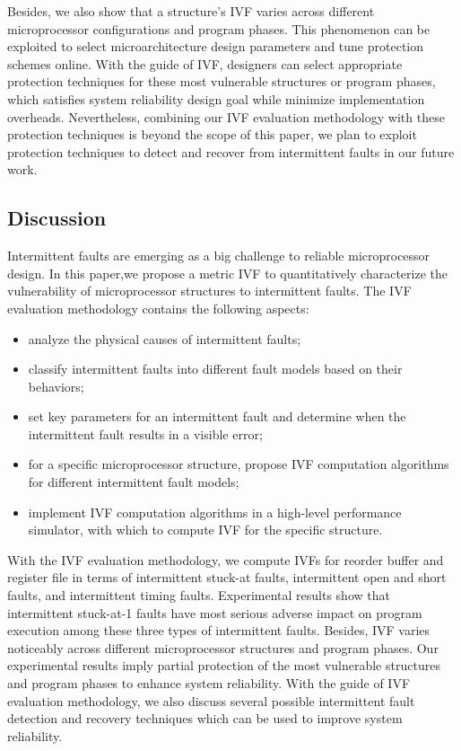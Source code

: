 Besides, we also show that a structure’s IVF varies across different microprocessor configurations and program phases. This phenomenon can be exploited to select microarchitecture design parameters and tune protection schemes online. With the guide of IVF, designers can select appropriate protection techniques for these most vulnerable structures or program phases, which satisfies system reliability design goal while minimize implementation overheads. Nevertheless, combining our IVF evaluation methodology with these protection techniques is beyond the scope of this paper, we plan to exploit protection techniques to detect and recover from intermittent faults in our future work.

\subsection{Discussion}
Intermittent faults are emerging as a big challenge to reliable microprocessor design. In this paper,we propose a metric IVF to quantitatively characterize the vulnerability of microprocessor structures to intermittent faults. The IVF evaluation methodology contains the following aspects:
\begin{itemize}
    \item analyze the physical causes of intermittent faults;
    \item classify intermittent faults into different fault models based on their behaviors;
    \item set key parameters for an intermittent fault and determine when the intermittent fault results in a visible error;
    \item for a specific microprocessor structure, propose IVF computation algorithms for different intermittent fault models;
    \item implement IVF computation algorithms in a high-level performance simulator, with which to compute IVF for the specific structure.
\end{itemize}

With the IVF evaluation methodology, we compute IVFs for reorder buffer and register file in terms of intermittent stuck-at faults, intermittent open and short faults, and intermittent timing faults. Experimental results show that intermittent stuck-at-1 faults have most serious adverse impact on program execution among these three types of intermittent faults. Besides, IVF varies noticeably across different microprocessor structures and program phases. Our experimental results imply partial protection of the most vulnerable structures and program phases to enhance system reliability. With the guide of IVF evaluation methodology, we also discuss several possible intermittent fault detection and recovery techniques which can be used to improve system reliability.

